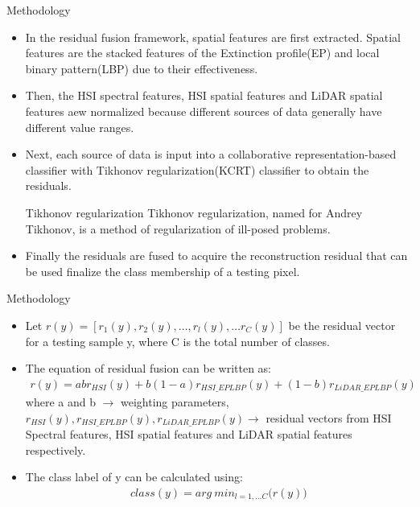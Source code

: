 \documentclass{beamer}
\begin{document}
\begin{frame}{Methodology}
    \begin{itemize}
        \item In the residual fusion framework, spatial features are first extracted. Spatial features are the stacked features of the Extinction profile(EP) and local binary pattern(LBP) due to their effectiveness.
        \item Then, the HSI spectral features, HSI spatial features and LiDAR spatial features aew normalized because different sources of data generally have different value ranges.
        \item Next, each source of data  is input into a collaborative representation-based classifier with Tikhonov regularization(KCRT) classifier to obtain the residuals.
        \begin{block}{Tikhonov regularization}
            Tikhonov regularization, named for Andrey Tikhonov, is a method of regularization of ill-posed problems. 
        \end{block}
        \item Finally the residuals are fused to acquire the reconstruction residual that can be used finalize the class membership of a testing pixel. 
    \end{itemize}
\end{frame}

\begin{frame}{Methodology}
    \begin{itemize}
        \item Let $r(y) = [r_1(y),r_2(y), \dots ,r_l(y), \dots r_C(y)]$ be the residual vector for a testing sample y, where C is the total number of classes.
        \item The equation of residual fusion can be written as:
        \begin{align}
            r(y) = abr_{HSI}(y) + b(1-a)r_{HSI\_EPLBP}(y) + (1-b)r_{LiDAR\_EPLBP}(y)
        \end{align}
        where a and b $\rightarrow$ weighting parameters, $r_{HSI}(y),r_{HSI\_EPLBP}(y),r_{LiDAR\_EPLBP}(y) \rightarrow$ residual vectors from HSI Spectral features, HSI spatial features and LiDAR spatial features respectively.
        \item The class label of y can be calculated using:
        \begin{align}
            class(y) = arg\ min_{l = 1, \dots C}\big(r(y)\big)
        \end{align}
    \end{itemize}
\end{frame}
\end{document}
